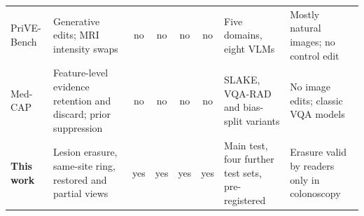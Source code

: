 \documentclass[10pt]{article}
\begin{document}
\begin{table}[!htbp]
\begin{center}
\begin{adjustbox}{max width=\linewidth}
\begin{tabular}{L{2.2cm}L{2.9cm}cccc L{2.0cm}L{2.6cm}}
PriVE-Bench \citep{sun2026prive} & Generative edits; MRI intensity swaps & no & no & no & no & Five domains, eight VLMs & Mostly natural images; no control edit \\
Med-CAP \citep{huang2026medcap} & Feature-level evidence retention and discard; prior suppression & no & no & no & no & SLAKE, VQA-RAD and bias-split variants & No image edits; classic VQA models \\
\textbf{This work} & Lesion erasure, same-site ring, restored and partial views & yes & yes & yes & yes & Main test, four further test sets, pre-registered & Erasure valid by readers only in colonoscopy \\
\bottomrule
\end{tabular}
\end{adjustbox}
\end{center}
\end{table}
\end{document}
